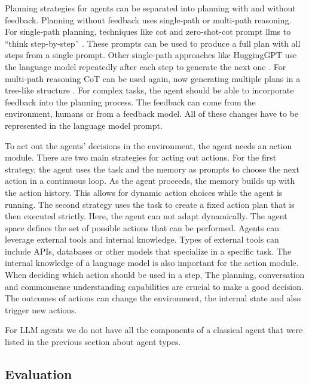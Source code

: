 \documentclass[../main.tex]{subfiles}
\begin{document}
Planning strategies for agents can be separated into planning with and without feedback.
Planning without feedback uses single-path or multi-path reasoning.
For single-path planning, techniques like \gls{cot} and zero-shot-\gls{cot} prompt \glspl{llm}
to ``think step-by-step'' \cite{Wei2022}.
These prompts can be used to produce a full plan with all steps from a single prompt.
Other single-path approaches like HuggingGPT
use the language model repeatedly after each step
to generate the next one \cite{Shen2023}.
For multi-path reasoning CoT can be used again, now generating multiple plans
in a tree-like structure \cite{Yao2023}.
For complex tasks, the agent should be able to incorporate feedback into
the planning process.
The feedback can come from the environment, humans or from a feedback model.
All of these changes have to be represented in the language model prompt.

To act out the agents' decisions in the environment, the agent needs an
action module.
There are two main strategies for acting out actions.
For the first strategy,
the agent uses the task and the memory as prompts
to choose the next action in a continuous loop.
As the agent proceeds, the memory builds up with the action history.
This allows for dynamic action choices while the agent is running.
The second strategy uses the task to create a fixed action plan
that is then executed strictly.
Here, the agent can not adapt dynamically.
The agent space defines the set of possible actions that can be performed.
Agents can leverage external tools and internal knowledge.
Types of external tools can include APIs, databases or other models
that specialize in a specific task.
The internal knowledge of a language model is also important for the action module.
When deciding which action should be used in a step,
The planning, conversation and commonsense understanding capabilities
are crucial to make a good decision.
The outcomes of actions can change the environment, the internal state and
also trigger new actions.

For LLM agents we do not have all the components of a classical agent
that were listed in the previous section about agent types.
\autocite{SignificantGravitas2024}

\subsection{Evaluation}

\end{document}
